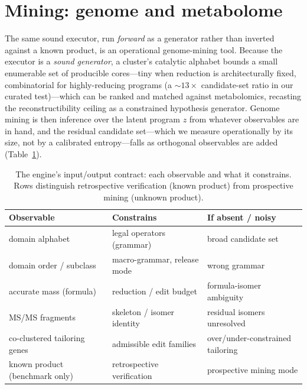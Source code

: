 \documentclass[11pt]{article}
\theoremstyle{definition}
\begin{document}


\section{Mining: genome and metabolome}
\label{sec:mining}

The same sound executor, run \emph{forward} as a generator rather than inverted against a known
product, is an operational genome-mining tool. Because the executor is a \emph{sound generator}, a
cluster's catalytic alphabet bounds a small enumerable set of producible cores---tiny when reduction
is architecturally fixed, combinatorial for highly-reducing programs (a $\sim\!13\times$
candidate-set ratio in our curated test)---which can be ranked and matched against metabolomics,
recasting the reconstructibility ceiling as a constrained hypothesis generator. Genome mining is
then inference over the latent program $z$ from whatever observables are in hand, and the residual
candidate set---which we measure operationally by its size, not by a calibrated entropy---falls as
orthogonal observables are added (Table~\ref{tab:io}).

\begin{table}[h]
\centering\small
\caption{The engine's input/output contract: each observable and what it constrains. Rows
distinguish retrospective verification (known product) from prospective mining (unknown product).}
\label{tab:io}
\begin{tabular}{@{}lll@{}}
\toprule
Observable & Constrains & If absent / noisy \\
\midrule
domain alphabet & legal operators (grammar) & broad candidate set \\
domain order / subclass & macro-grammar, release mode & wrong grammar \\
accurate mass (formula) & reduction / edit budget & formula-isomer ambiguity \\
MS/MS fragments & skeleton / isomer identity & residual isomers unresolved \\
co-clustered tailoring genes & admissible edit families & over/under-constrained tailoring \\
known product (benchmark only) & retrospective verification & prospective mining mode \\
\bottomrule
\end{tabular}
\end{table}
\end{document}
